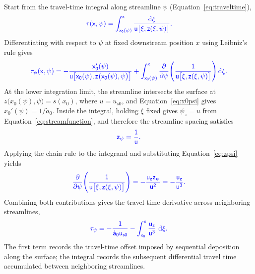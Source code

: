 \documentclass[review]{igs}
\providecommand{\DIFadd}[1]{{\protect\color{blue} \sf #1}} %
\begin{document}
\DIFadd{Start from the travel-time integral along streamline \(\psi\) (Equation~\ref{eq:traveltime}),
}\begin{equation}
\DIFadd{\tau(x,\psi)=\int_{x_0(\psi)}^{x}
\frac{\mathop{}\!\mathrm{d}\xi}{u\bigl[\xi,z(\xi,\psi)\bigr]}.
}\end{equation}
\DIFadd{Differentiating with respect to \(\psi\) at fixed downstream position \(x\) using Leibniz's rule gives
}\begin{equation}
\DIFadd{\tau_{\psi}(x,\psi)
=-\frac{x_0'(\psi)}{u\bigl[x_0(\psi),z\bigl(x_0(\psi),\psi\bigr)\bigr]}
+\int_{x_0(\psi)}^{x}
\frac{\partial}{\partial\psi}\!\left(\frac{1}{u\bigl[\xi,z(\xi,\psi)\bigr]}\right)\mathop{}\!\mathrm{d}\xi.
}\end{equation}
\DIFadd{At the lower integration limit, the streamline intersects the surface at \(z\bigl(x_0(\psi),\psi\bigr)=s(x_0)\), where \(u=u_{s0}\), and Equation~\ref{eq:x0psi} gives \(x_0'(\psi)=1/\dot a_0\). Inside the integral, holding \(\xi\) fixed gives \(\psi_z=u\) from Equation~\ref{eq:streamfunction}, and therefore the streamline spacing satisfies
}\begin{equation}
\DIFadd{z_{\psi}=\frac{1}{u}.
\label{eq:zpsi}
}\end{equation}
\DIFadd{Applying the chain rule to the integrand and substituting Equation~\ref{eq:zpsi} yields
}\begin{equation}
\DIFadd{\frac{\partial}{\partial\psi}\!\left(\frac{1}{u\bigl[\xi,z(\xi,\psi)\bigr]}\right)
=-\frac{u_z z_{\psi}}{u^2}
=-\frac{u_z}{u^3}.
}\end{equation}
\DIFadd{Combining both contributions gives the travel-time derivative across neighboring streamlines,
}\begin{equation}
\DIFadd{\tau_{\psi}
=-\frac{1}{\dot a_0u_{s0}}
-\int_{x_0}^{x}\frac{u_z}{u^3}\,\mathop{}\!\mathrm{d}\xi.
\label{eq:taupsi}
}\end{equation}
\DIFadd{The first term records the travel-time offset imposed by sequential deposition along the surface; the integral records the subsequent differential travel time accumulated between neighboring streamlines.
}
\end{document}
